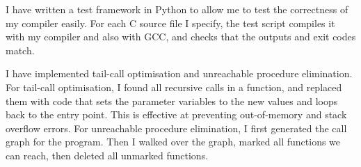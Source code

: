 \documentclass[12pt, a4paper]{article}
\begin{document}
I have written a test framework in Python to allow me to test the correctness of my compiler easily.
For each C source file I specify, the test script compiles it with my compiler and also with GCC, and checks that the outputs and exit codes match.

I have implemented tail-call optimisation and unreachable procedure elimination.
For tail-call optimisation, I found all recursive calls in a function, and replaced them with code that sets the parameter variables to the new values and loops back to the entry point.
This is effective at preventing out-of-memory and stack overflow errors.
For unreachable procedure elimination, I first generated the call graph for the program. Then I walked over the graph, marked all functions we can reach, then deleted all unmarked functions.
\end{document}
